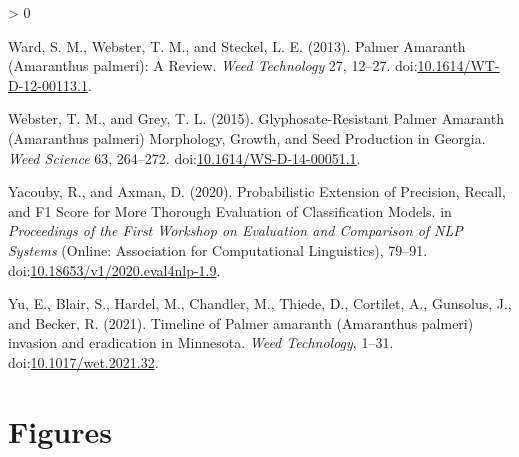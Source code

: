 \documentclass[utf8]{frontiersSCNS}
\newlength{\cslhangindent}
\newenvironment{CSLReferences}[2] %
 {%
  \setlength{\parindent}{0pt}
  \ifodd #1 \everypar{\setlength{\hangindent}{\cslhangindent}}\ignorespaces\fi
  \ifnum #2 > 0
  \setlength{\parskip}{#2\baselineskip}
  \fi
 }%
 {}
\begin{document}
\begin{CSLReferences}{1}{0}
\leavevmode\hypertarget{ref-ward2013}{}%
Ward, S. M., Webster, T. M., and Steckel, L. E. (2013). Palmer
{Amaranth} ({Amaranthus} palmeri): {A Review}. \emph{Weed Technology}
27, 12--27.
doi:\href{https://doi.org/10.1614/WT-D-12-00113.1}{10.1614/WT-D-12-00113.1}.

\leavevmode\hypertarget{ref-webster2015}{}%
Webster, T. M., and Grey, T. L. (2015). Glyphosate-{Resistant Palmer
Amaranth} ({Amaranthus} palmeri) {Morphology}, {Growth}, and {Seed
Production} in {Georgia}. \emph{Weed Science} 63, 264--272.
doi:\href{https://doi.org/10.1614/WS-D-14-00051.1}{10.1614/WS-D-14-00051.1}.

\leavevmode\hypertarget{ref-yacouby2020}{}%
Yacouby, R., and Axman, D. (2020). Probabilistic {Extension} of
{Precision}, {Recall}, and {F1 Score} for {More Thorough Evaluation} of
{Classification Models}. in \emph{Proceedings of the {First Workshop} on
{Evaluation} and {Comparison} of {NLP Systems}} ({Online}: {Association
for Computational Linguistics}), 79--91.
doi:\href{https://doi.org/10.18653/v1/2020.eval4nlp-1.9}{10.18653/v1/2020.eval4nlp-1.9}.

\leavevmode\hypertarget{ref-yu2021}{}%
Yu, E., Blair, S., Hardel, M., Chandler, M., Thiede, D., Cortilet, A.,
Gunsolus, J., and Becker, R. (2021). Timeline of {Palmer} amaranth
({Amaranthus} palmeri) invasion and eradication in {Minnesota}.
\emph{Weed Technology}, 1--31.
doi:\href{https://doi.org/10.1017/wet.2021.32}{10.1017/wet.2021.32}.

\end{CSLReferences}

\hypertarget{figures}{%
\section*{Figures}\label{figures}}
\end{document}
